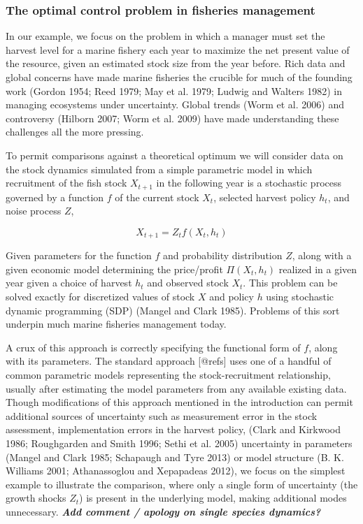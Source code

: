 \documentclass[author-year, review]{elsarticle} %
\begin{document}
\subsubsection{The optimal control problem in fisheries management}

In our example, we focus on the problem in which a manager must set the
harvest level for a marine fishery each year to maximize the net present
value of the resource, given an estimated stock size from the year
before. Rich data and global concerns have made marine fisheries the
crucible for much of the founding work (Gordon 1954; Reed 1979; May et
al. 1979; Ludwig and Walters 1982) in managing ecosystems under
uncertainty. Global trends (Worm et al. 2006) and controversy (Hilborn
2007; Worm et al. 2009) have made understanding these challenges all the
more pressing.

To permit comparisons against a theoretical optimum we will consider
data on the stock dynamics simulated from a simple parametric model in
which recruitment of the fish stock $X_{t+1}$ in the following year is a
stochastic process governed by a function $f$ of the current stock
$X_t$, selected harvest policy $h_t$, and noise process $Z$,

\[X_{t+1} = Z_t f(X_t, h_t) \]

Given parameters for the function $f$ and probability distribution $Z$,
along with a given economic model determining the price/profit
$\Pi(X_t, h_t)$ realized in a given year given a choice of harvest $h_t$
and observed stock $X_t$. This problem can be solved exactly for
discretized values of stock $X$ and policy $h$ using stochastic dynamic
programming (SDP) (Mangel and Clark 1985). Problems of this sort
underpin much marine fisheries management today.

A crux of this approach is correctly specifying the functional form of
$f$, along with its parameters. The standard approach {[}@refs{]} uses
one of a handful of common parametric models representing the
stock-recruitment relationship, usually after estimating the model
parameters from any available existing data. Though modifications of
this approach mentioned in the introduction can permit additional
sources of uncertainty such as measurement error in the stock
assessment, implementation errors in the harvest policy, (Clark and
Kirkwood 1986; Roughgarden and Smith 1996; Sethi et al. 2005)
uncertainty in parameters (Mangel and Clark 1985; Schapaugh and Tyre
2013) or model structure (B. K. Williams 2001; Athanassoglou and
Xepapadeas 2012), we focus on the simplest example to illustrate the
comparison, where only a single form of uncertainty (the growth shocks
$Z_t$) is present in the underlying model, making additional modes
unnecessary. \textbf{\emph{Add comment / apology on single species
dynamics?}}
\end{document}
